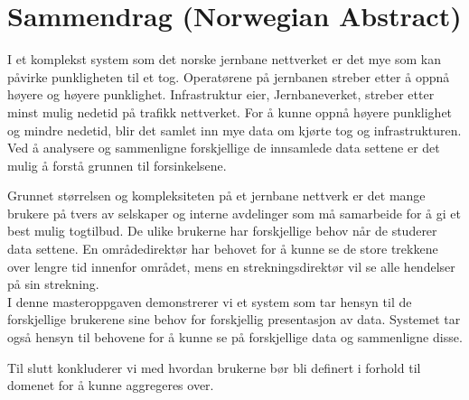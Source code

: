 \section*{Sammendrag (Norwegian Abstract)}

I et komplekst system som det norske jernbane nettverket er det mye som kan
påvirke punkligheten til et tog. Operatørene på jernbanen streber etter å oppnå
høyere og høyere punklighet. Infrastruktur eier, Jernbaneverket,  streber etter
minst mulig nedetid på trafikk nettverket. For å kunne oppnå høyere punklighet
og mindre nedetid, blir det samlet inn mye data om kjørte tog og
infrastrukturen. Ved å analysere og sammenligne forskjellige de innsamlede data settene er det mulig å forstå grunnen til forsinkelsene.

Grunnet størrelsen og kompleksiteten på et jernbane nettverk er det mange 
brukere på tvers av selskaper og interne avdelinger som må samarbeide for å gi 
et best mulig togtilbud. De ulike brukerne har forskjellige behov når de 
studerer data settene. En områdedirektør har behovet for å kunne se de store 
trekkene over lengre tid innenfor området, mens en strekningsdirektør vil se 
alle hendelser på sin strekning.\\

I denne masteroppgaven demonstrerer vi et system som tar hensyn til de
forskjellige brukerene sine behov for forskjellig presentasjon av data.
Systemet tar også hensyn til behovene for å kunne se på forskjellige data
og sammenligne disse.

Til slutt konkluderer vi med hvordan brukerne bør bli definert i forhold til
domenet for å kunne aggregeres over.
	
\clearpage

